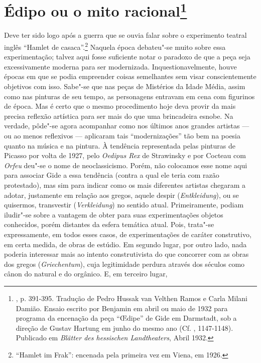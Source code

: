 \chapter{Édipo ou o mito racional\footnote[*]{, p. 391-395. Tradução de
  Pedro Hussak van Velthen Ramos e Carla Milani Damião. Ensaio escrito
  por Benjamin em abril ou maio de 1932 para programa da encenação da
  peça ``\OE dipe'' de Gide em Darmstadt, sob a direção de Gustav Hartung
  em junho do mesmo ano (Cf. , 1147-1148). Publicado em
  \emph{Blätter des hessischen Landtheaters}, Abril 1932.}}

Deve ter sido logo após a guerra que se ouvia falar sobre o experimento
teatral inglês ``Hamlet de casaca''.\footnote{``Hamlet im Frak'':
  encenada pela primeira vez em Viena, em 1926. \versal{[N. E.]}} Naquela época
debateu"-se muito sobre essa experimentação; talvez aqui fosse suficiente
notar o paradoxo de que a peça seja excessivamente moderna para ser
modernizada. Inquestionavelmente, houve épocas em que se podia
empreender coisas semelhantes sem visar conscientemente objetivos com
isso. Sabe"-se que nas peças de Mistérios da Idade Média, assim como nas
pinturas de seu tempo, as personagens entravam em cena com figurinos de
época. Mas é certo que o mesmo procedimento hoje deva provir da mais
precisa reflexão artística para ser mais do que uma brincadeira esnobe.
Na verdade, pôde"-se agora acompanhar como nos últimos anos grandes
artistas --- ou ao menos reflexivos --- aplicaram tais ``modernizações''
tão bem na poesia quanto na música e na pintura. À tendência
representada pelas pinturas de Picasso por volta de 1927, pelo
\emph{Oedipus Rex} de Strawinsky e por Cocteau com \emph{Orfeu} deu"-se o
nome de neoclassicismo. Porém, não colocamos esse nome aqui para
associar Gide a essa tendência (contra a qual ele teria com razão
protestado), mas sim para indicar como os mais diferentes artistas
chegaram a adotar, justamente em relação aos gregos, aquele despir
(\emph{Entkleidung}), ou se quisermos, transvestir (\emph{Verkleidung})
no sentido atual. Primeiramente, podiam iludir"-se sobre a vantagem de
obter para suas experimentações objetos conhecidos, porém distantes da
esfera temática atual. Pois, trata"-se expressamente, em todos esses
casos, de experimentações de caráter construtivo, em certa medida, de
obras de estúdio. Em segundo lugar, por outro lado, nada poderia
interessar mais ao intento construtivista do que concorrer com as obras
dos gregos (\emph{Griechentum}), cuja legitimidade perdura através dos
séculos como cânon do natural e do orgânico. E, em terceiro lugar,
